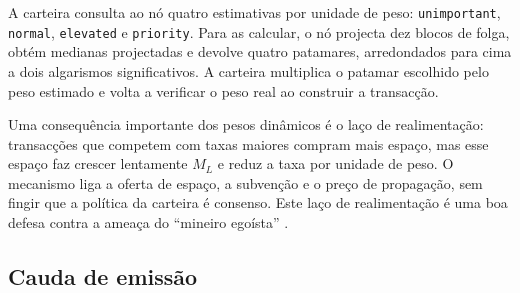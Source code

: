 %
A carteira consulta ao nó quatro estimativas por unidade de peso:
{\tt unimportant}, {\tt normal}, {\tt elevated} e {\tt priority}. Para as
calcular, o nó projecta dez blocos de folga, obtém medianas projectadas e
devolve quatro patamares, arredondados para cima a dois
algarismos significativos. A carteira multiplica o patamar escolhido pelo peso estimado e
volta a verificar o peso real ao construir a transacção.


Uma consequência importante dos pesos dinâmicos é o laço de realimentação:
transacções que competem com taxas maiores compram mais espaço, mas esse espaço
faz crescer lentamente $M_L$ e reduz a taxa por unidade de peso. O mecanismo
liga a oferta de espaço, a subvenção e o preço de propagação, sem fingir que a
política da carteira é consenso.
Este laço de realimentação é uma boa defesa contra a ameaça do
``mineiro egoísta'' \cite{selfish-miner}.


\subsection{Cauda de emissão}
\label{subsec:emission-tail}

